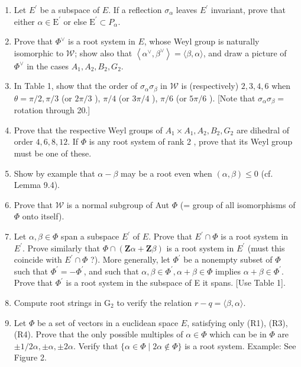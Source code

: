 \documentclass[10pt]{article}
\begin{document}
\begin{enumerate}
  \item Let $E^{\prime}$ be a subspace of $E$. If a reflection $\sigma_{\alpha}$ leaves $E^{\prime}$ invariant, prove that either $\alpha \in \mathrm{E}^{\prime}$ or else $\mathrm{E}^{\prime} \subset P_{\alpha}$.
  \item Prove that $\Phi^{\vee}$ is a root system in $E$, whose Weyl group is naturally isomorphic to $\mathscr{W}$; show also that $\left\langle\alpha^{\vee}, \beta^{\vee}\right\rangle=\langle\beta, \alpha\rangle$, and draw a picture of $\Phi^{\vee}$ in the cases $A_{1}, A_{2}, B_{2}, G_{2}$.
  \item In Table 1, show that the order of $\sigma_{\alpha} \sigma_{\beta}$ in $\mathscr{W}$ is (respectively) $2,3,4,6$ when $\theta=\pi / 2, \pi / 3$ (or $2 \pi / 3$ ), $\pi / 4$ (or $3 \pi / 4$ ), $\pi / 6$ (or $5 \pi / 6$ ). [Note that $\sigma_{\alpha} \sigma_{\beta}=$ rotation through 20.]
  \item Prove that the respective Weyl groups of $A_{1} \times A_{1}, A_{2}, B_{2}, G_{2}$ are dihedral of order $4,6,8,12$. If $\Phi$ is any root system of rank 2 , prove that its Weyl group must be one of these.
  \item Show by example that $\alpha-\beta$ may be a root even when $(\alpha, \beta) \leq 0$ (cf. Lemma 9.4).
  \item Prove that $\mathscr{W}$ is a normal subgroup of Aut $\Phi$ (= group of all isomorphisms of $\Phi$ onto itself).
  \item Let $\alpha, \beta \in \Phi$ span a subspace $E^{\prime}$ of $E$. Prove that $E^{\prime} \cap \Phi$ is a root system in $E^{\prime}$. Prove similarly that $\Phi \cap(\mathbf{Z} \alpha+\mathbf{Z} \beta)$ is a root system in $E^{\prime}$ (must this coincide with $E^{\prime} \cap \Phi$ ?). More generally, let $\Phi^{\prime}$ be a nonempty subset of $\Phi$ such that $\Phi^{\prime}=-\Phi^{\prime}$, and such that $\alpha, \beta \in \Phi^{\prime}, \alpha+\beta \in \Phi$ implies $\alpha+\beta \in \Phi^{\prime}$. Prove that $\Phi^{\prime}$ is a root system in the subspace of E it spans. [Use Table 1].
  \item Compute root strings in $\mathrm{G}_{2}$ to verify the relation $r-q=\langle\beta, \alpha\rangle$.
  \item Let $\Phi$ be a set of vectors in a euclidean space $E$, satisfying only (R1), (R3), (R4). Prove that the only possible multiples of $\alpha \in \Phi$ which can be in $\Phi$ are $\pm 1 / 2 \alpha, \pm \alpha, \pm 2 \alpha$. Verify that $\{\alpha \in \Phi \mid 2 \alpha \notin \Phi\}$ is a root system. Example: See Figure 2.\\

\end{enumerate}
\end{document}
